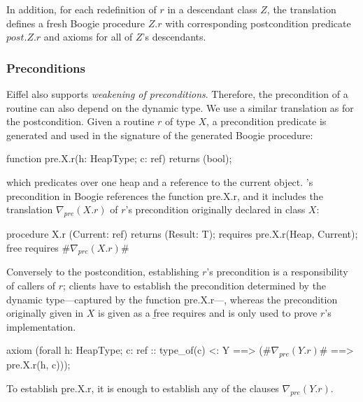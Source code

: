 In addition, for each redefinition of $r$ in a descendant class $Z$, 
the translation defines a fresh Boogie procedure $Z.r$ with 
corresponding postcondition predicate $post.Z.r$ and axioms 
for all of $Z$'s descendants.


\subsubsection{Preconditions}


Eiffel also supports \emph{weakening of preconditions}. Therefore, the precondition
of a routine can also depend on the dynamic type. We use a similar
translation as for the postcondition. Given a routine $r$ of type $X$, 
a precondition predicate is generated and used in the signature 
of the generated Boogie procedure:
\begin{brunning}
function pre.X.r(h: HeapType; c: ref) returns (bool);
\end{brunning}
which predicates over one heap and a reference  to the current object.
's precondition in Boogie references the function \b{pre.X.r}, and it includes the translation $\nabla_{pre}(X.r)$ of $r$'s precondition originally declared in class $X$:
\begin{brunning}
procedure X.r (Current: ref) returns (Result: T);
	requires pre.X.r(Heap, Current);
	free requires #$\nabla_{pre}(X.r)$#
\end{brunning}
Conversely to the postcondition, establishing $r$'s precondition is a responsibility of callers of $r$; clients have to establish the precondition determined by the dynamic type---captured by the function \b{pre.X.r}---, whereas the precondition originally given in $X$ is given as a \b{free requires} and is only used to prove $r$'s implementation.
\begin{brunning}
axiom (forall h: HeapType; c: ref ::
		type_of(c) <: Y ==> (#$\nabla_{pre}(Y.r)$# ==> pre.X.r(h, c)));
\end{brunning}
To establish \b{pre.X.r}, it is enough to establish any of the clauses $\nabla_{pre}(Y.r)$.


